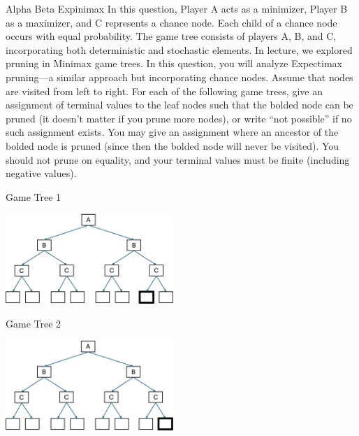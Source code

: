 \documentclass[twoside]{article}
\newcommand{\solutionspace}[4]{\fbox{\begin{minipage}[t][#1][t]{#2} \textbf{#3} 

\solution{}{#4} \end{minipage}}}
\begin{document}
\clearpage

\begin{problem}{Alpha Beta Expinimax}
In this question, Player A acts as a minimizer, Player B as a maximizer, and C represents a chance node. Each child of a chance node occurs with equal probability. The game tree consists of players A, B, and C, incorporating both deterministic and stochastic elements. In lecture, we explored pruning in Minimax game trees. In this question, you will analyze Expectimax pruning—a similar approach but incorporating chance nodes. Assume that nodes are visited from left to right. For each of the following game trees, give an assignment of terminal values to the leaf nodes such that the bolded node can be pruned (it doesn’t matter if you prune more nodes), or write “not possible” if no such
assignment exists. You may give an assignment where an ancestor of the bolded node is pruned (since then
the bolded node will never be visited). You should not prune on equality, and your terminal values must be
finite (including negative values).

\begin{question}[8] Game Tree 1

\begin{center}
\includegraphics[width=2.5in]{alpha_beta_1.png}
\end{center}

\solutionspace{1cm}{15cm}{}
{\Foura}

\end{question}

\begin{question}[8] Game Tree 2

\begin{center}
\includegraphics[width=2.5in]{alpha_beta_2.png}
\end{center}


\end{question}
\end{problem}
\end{document}
